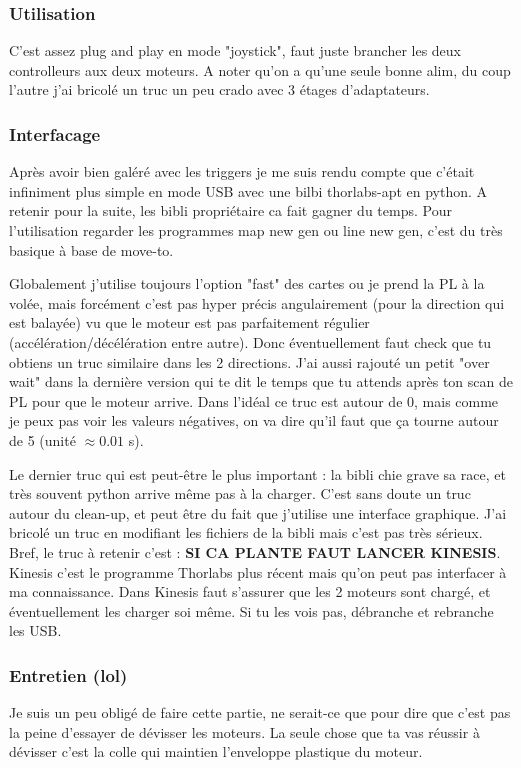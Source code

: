 \documentclass[a4paper]{report}
\begin{document}
  \subsubsection{Utilisation}
  C'est assez plug and play en mode "joystick", faut juste brancher les deux controlleurs aux deux moteurs. A noter qu'on a qu'une seule bonne alim, du coup l'autre j'ai bricolé un truc un peu crado avec 3 étages d'adaptateurs.
  \subsubsection{Interfacage}
  Après avoir bien galéré avec les triggers je me suis rendu compte que c'était infiniment plus simple en mode USB avec une bilbi thorlabs-apt en python. A retenir pour la suite, les bibli propriétaire ca fait gagner du temps. Pour l'utilisation regarder les programmes map new gen ou line new gen, c'est du très basique à base de move-to.
  
  Globalement j'utilise toujours l'option "fast" des cartes ou je prend la PL à la volée, mais forcément c'est pas hyper précis angulairement (pour la direction qui est balayée) vu que le moteur est pas parfaitement régulier (accélération/décélération entre autre). Donc éventuellement faut check que tu obtiens un truc similaire dans les 2 directions. J'ai aussi rajouté un petit "over wait" dans la dernière version qui te dit le temps que tu attends après ton scan de PL pour que le moteur arrive. Dans l'idéal ce truc est autour de 0, mais comme je peux pas voir les valeurs négatives, on va dire qu'il faut que ça tourne autour de 5 (unité $\approx 0.01$ s).
  
  Le dernier truc qui est peut-être le plus important : la bibli chie grave sa race, et très souvent python arrive même pas à la charger. C'est sans doute un truc autour du clean-up, et peut être du fait que j'utilise une interface graphique. J'ai bricolé un truc en modifiant les fichiers de la bibli mais c'est pas très sérieux. Bref, le truc à retenir c'est : \textbf{SI CA PLANTE FAUT LANCER KINESIS}. Kinesis c'est le programme Thorlabs plus récent mais qu'on peut pas interfacer à ma connaissance. Dans Kinesis faut s'assurer que les 2 moteurs sont chargé, et éventuellement les charger soi même. Si tu les vois pas, débranche et rebranche les USB.
  \subsubsection{Entretien (lol)}
  Je suis un peu obligé de faire cette partie, ne serait-ce que pour dire que c'est pas la peine d'essayer de dévisser les moteurs. La seule chose que ta vas réussir à dévisser c'est la colle qui maintien l'enveloppe plastique du moteur.
  
\end{document}
